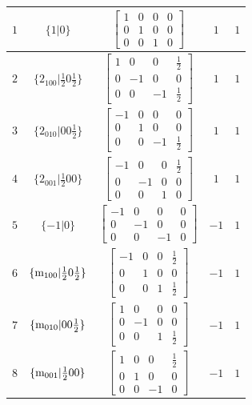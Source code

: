 \documentclass[fleqn,8pt]{jsarticle}
\begin{document}
\begin{longtable}{ccccc}
$ 1 $ & $ \{1|0\} $ & $ \begin{bmatrix} 1 & 0 & 0 & 0 \\ 0 & 1 & 0 & 0 \\ 0 & 0 & 1 & 0 \end{bmatrix} $ & $ 1 $ & $ 1 $ \\ \hline
$ 2 $ & $ \{2{}_{100}|\frac{1}{2} 0 \frac{1}{2}\} $ & $ \begin{bmatrix} 1 & 0 & 0 & \frac{1}{2} \\ 0 & -1 & 0 & 0 \\ 0 & 0 & -1 & \frac{1}{2} \end{bmatrix} $ & $ 1 $ & $ 1 $ \\ \hline
$ 3 $ & $ \{2{}_{010}|0 0 \frac{1}{2}\} $ & $ \begin{bmatrix} -1 & 0 & 0 & 0 \\ 0 & 1 & 0 & 0 \\ 0 & 0 & -1 & \frac{1}{2} \end{bmatrix} $ & $ 1 $ & $ 1 $ \\ \hline
$ 4 $ & $ \{2{}_{001}|\frac{1}{2} 0 0\} $ & $ \begin{bmatrix} -1 & 0 & 0 & \frac{1}{2} \\ 0 & -1 & 0 & 0 \\ 0 & 0 & 1 & 0 \end{bmatrix} $ & $ 1 $ & $ 1 $ \\ \hline
$ 5 $ & $ \{-1|0\} $ & $ \begin{bmatrix} -1 & 0 & 0 & 0 \\ 0 & -1 & 0 & 0 \\ 0 & 0 & -1 & 0 \end{bmatrix} $ & $ -1 $ & $ 1 $ \\ \hline
$ 6 $ & $ \{{\rm m}_{100}|\frac{1}{2} 0 \frac{1}{2}\} $ & $ \begin{bmatrix} -1 & 0 & 0 & \frac{1}{2} \\ 0 & 1 & 0 & 0 \\ 0 & 0 & 1 & \frac{1}{2} \end{bmatrix} $ & $ -1 $ & $ 1 $ \\ \hline
$ 7 $ & $ \{{\rm m}_{010}|0 0 \frac{1}{2}\} $ & $ \begin{bmatrix} 1 & 0 & 0 & 0 \\ 0 & -1 & 0 & 0 \\ 0 & 0 & 1 & \frac{1}{2} \end{bmatrix} $ & $ -1 $ & $ 1 $ \\ \hline
$ 8 $ & $ \{{\rm m}_{001}|\frac{1}{2} 0 0\} $ & $ \begin{bmatrix} 1 & 0 & 0 & \frac{1}{2} \\ 0 & 1 & 0 & 0 \\ 0 & 0 & -1 & 0 \end{bmatrix} $ & $ -1 $ & $ 1 $ \\ \hline

\end{longtable}
\end{document}
